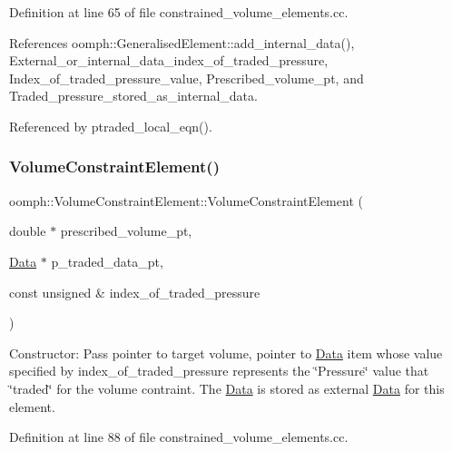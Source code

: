 Definition at line 65 of file constrained\+\_\+volume\+\_\+elements.\+cc.



References oomph\+::\+Generalised\+Element\+::add\+\_\+internal\+\_\+data(), External\+\_\+or\+\_\+internal\+\_\+data\+\_\+index\+\_\+of\+\_\+traded\+\_\+pressure, Index\+\_\+of\+\_\+traded\+\_\+pressure\+\_\+value, Prescribed\+\_\+volume\+\_\+pt, and Traded\+\_\+pressure\+\_\+stored\+\_\+as\+\_\+internal\+\_\+data.



Referenced by ptraded\+\_\+local\+\_\+eqn().

\mbox{\label{classoomph_1_1VolumeConstraintElement_adc0fc16f4fc708fb09d70cb791a6c6b9}} 
\subsubsection{\texorpdfstring{Volume\+Constraint\+Element()}{VolumeConstraintElement()}\hspace{0.1cm}{\footnotesize\ttfamily [2/2]}}
{\footnotesize\ttfamily oomph\+::\+Volume\+Constraint\+Element\+::\+Volume\+Constraint\+Element (\begin{DoxyParamCaption}\item[{double $\ast$}]{prescribed\+\_\+volume\+\_\+pt,  }\item[{\hyperlink{classoomph_1_1Data}{Data} $\ast$}]{p\+\_\+traded\+\_\+data\+\_\+pt,  }\item[{const unsigned \&}]{index\+\_\+of\+\_\+traded\+\_\+pressure }\end{DoxyParamCaption})}



Constructor\+: Pass pointer to target volume, pointer to \hyperlink{classoomph_1_1Data}{Data} item whose value specified by index\+\_\+of\+\_\+traded\+\_\+pressure represents the \char`\"{}\+Pressure\char`\"{} value that \char`\"{}traded\char`\"{} for the volume contraint. The \hyperlink{classoomph_1_1Data}{Data} is stored as external \hyperlink{classoomph_1_1Data}{Data} for this element. 



Definition at line 88 of file constrained\+\_\+volume\+\_\+elements.\+cc.



